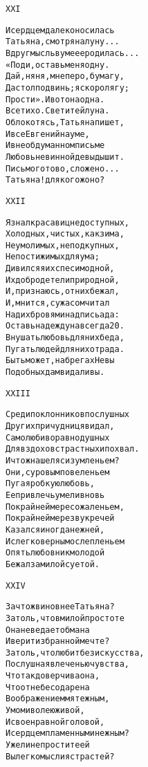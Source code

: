 \begin{minipage}[t]{\dimexpr 0.5\textwidth -\tabcolsep-.5pt}
\begin{alltt}\normalfont\centering
XXI

И сердцем далеко носилась
Татьяна, смотря на луну...
Вдруг мысль в уме ее родилась...
«Поди, оставь меня одну.
Дай, няня, мне перо, бумагу,
Да стол подвинь; я скоро лягу;
Прости». И вот она одна.
Все тихо. Светит ей луна.
Облокотясь, Татьяна пишет,
И все Евгений на уме,
И в необдуманном письме
Любовь невинной девы дышит.
Письмо готово, сложено...
Татьяна! для кого ж оно?
\end{alltt}
\end{minipage}

\begin{minipage}[t]{\dimexpr 0.5\textwidth -\tabcolsep-.5pt}
\begin{alltt}\normalfont\centering
XXII

Я знал красавиц недоступных,
Холодных, чистых, как зима,
Неумолимых, неподкупных,
Непостижимых для ума;
Дивился я их спеси модной,
Их добродетели природной,
И, признаюсь, от них бежал,
И, мнится, с ужасом читал
Над их бровями надпись ада:
Оставь надежду навсегда 20.
Внушать любовь для них беда,
Пугать людей для них отрада.
Быть может, на брегах Невы
Подобных дам видали вы.
\end{alltt}
\end{minipage}
\clearpage

\begin{minipage}[t]{\dimexpr 0.5\textwidth -\tabcolsep-.5pt}
\begin{alltt}\normalfont\centering
XXIII

Среди поклонников послушных
Других причудниц я видал,
Самолюбиво равнодушных
Для вздохов страстных и похвал.
И что ж нашел я с изумленьем?
Они, суровым повеленьем
Пугая робкую любовь,
Ее привлечь умели вновь
По крайней мере сожаленьем,
По крайней мере звук речей
Казался иногда нежней,
И с легковерным ослепленьем
Опять любовник молодой
Бежал за милой суетой.
\end{alltt}
\end{minipage}

\begin{minipage}[t]{\dimexpr 0.5\textwidth -\tabcolsep-.5pt}
\begin{alltt}\normalfont\centering
XXIV

За что ж виновнее Татьяна?
За то ль, что в милой простоте
Она не ведает обмана
И верит избранной мечте?
За то ль, что любит без искусства,
Послушная влеченью чувства,
Что так доверчива она,
Что от небес одарена
Воображением мятежным,
Умом и волею живой,
И своенравной головой,
И сердцем пламенным и нежным?
Ужели не простите ей
Вы легкомыслия страстей?
\end{alltt}
\end{minipage}
\clearpage

